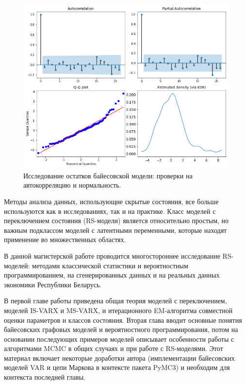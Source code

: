 \documentclass[a4paper,14pt]{extreport}
\begin{document}
\begin{figure}[H]
	\includegraphics[width=\linewidth]{img/gen/pp_ms_arx_resid.png}
	\caption{
		Исследование остатков байесовской модели: 
		проверки на автокорреляцию и нормальность.
	}
	\label{fig:pp_ms_arx_resid}
\end{figure}




Методы анализа данных, использующие скрытые состояния, все больше используются как в исследованиях, так и на практике. Класс моделей с переключением состояния (RS-модели) является относительно простым, но важным подклассом моделей с латентными переменными, которые находят применение во множественных областях. 

В данной магистерской работе проводится многостороннее исследование RS-моделей: методами классической статистики и вероятностным программированием, на сгенерированных данных и на реальных данных экономики Республики Беларусь. 

В первой главе работы приведена общая теория моделей с переключением, моделей IS-VARX и MS-VARX, и итерационного EM-алгоритма совместной оценки параметров и классов состояния. Вторая глава вводит основные понятия байесовских графовых моделей и вероятностного программирования, потом на основании последующих примеров моделей описывает особенности работы с алгоритмами MCMC в общих случаях и при работе с RS-моделями. Этот материал включает некоторые доработки автора (имплементации байесовских моделей VAR и цепи Маркова в контексте пакета PyMC3) и необходим для контекста последней главы.
\end{document}
